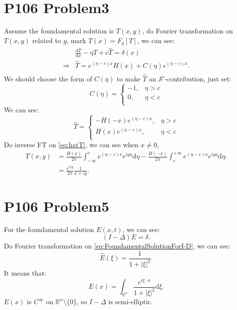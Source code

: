 \documentclass[a4paper]{ctexart}
\newcommand{\dif}{\mathrm{d}}
\newcommand{\difFrac}[2]{\frac{\dif #1}{\dif #2}}
\begin{document}
\section*{P106 Problem3}
Assume the foundamental solution is $T(x,y)$, do Fourier transformation on $T(x,y)$ related to $y$, mark $\hat{T}(x)=F_{y}[T]$, we can see:
\begin{equation}
    \label{eq:FTforT}
    \begin{aligned}
        &\difFrac{\hat{T}}{x}-\eta\hat{T}+c\hat{T}=\delta(x)\\
        \Rightarrow&\hat{T}=e^{(\eta-c)x}H(x)+C(\eta)e^{(\eta-c)x}.\\
    \end{aligned}
\end{equation}
We should choose the form of $C(\eta)$ to make $\hat{T}$ an $\mathscr{S}'$-contribution, just set:
\begin{equation}
    \label{eq:chooseeta}
    C(\eta)=\left\{
        \begin{aligned}
            -1,&\eta>c\\
            0,&\eta<c\\
        \end{aligned}
    \right.
\end{equation}
We can see:
\begin{equation}
    \label{eq:hatT}
    \hat{T}=\left\{
        \begin{aligned}
            -H(-x)e^{(\eta-c)x},&\eta>c\\
            H(x)e^{(\eta-c)x},&\eta<c\\
        \end{aligned}
    \right.
\end{equation}
Do inverse FT on \eqref{eq:hatT}, we can see when $x\neq 0$,
\begin{equation}
    \begin{aligned}
        T(x,y)&=\frac{H(x)}{2\pi}\int_{-\infty}^{c}e^{(\eta-c)x}e^{iy\eta}\dif\eta
        -\frac{H(-x)}{2\pi}\int_{c}^{+\infty}e^{(\eta-c)x}e^{iy\eta}\dif\eta.\\
        &=\frac{e^{icy}}{2\pi}\frac{1}{x+iy}.
    \end{aligned}
\end{equation}
\section*{P106 Problem5}
For the foundamental solution $E(x,t)$, we can see:
\begin{equation}
    \label{eq:FoundamentalSolutionForI-D}
    (I-\Delta)E=\delta.
\end{equation}
Do Fourier transformation on \eqref{eq:FoundamentalSolutionForI-D}, we can see:
\begin{equation}
    \hat{E}(\xi)=\frac{1}{1+|\xi|^2}.
\end{equation}
It means that:
\begin{equation}
    E(x)=\int_{\mathbb{R}^{n}}\frac{e^{i\xi\cdot x}}{1+|\xi|^2}\dif\xi.
\end{equation}
$E(x)$ is $C^{\infty}$ on $\mathbb{R}^{n}\setminus\{0\}$, so $I-\Delta$ is semi-elliptic.
\end{document}

